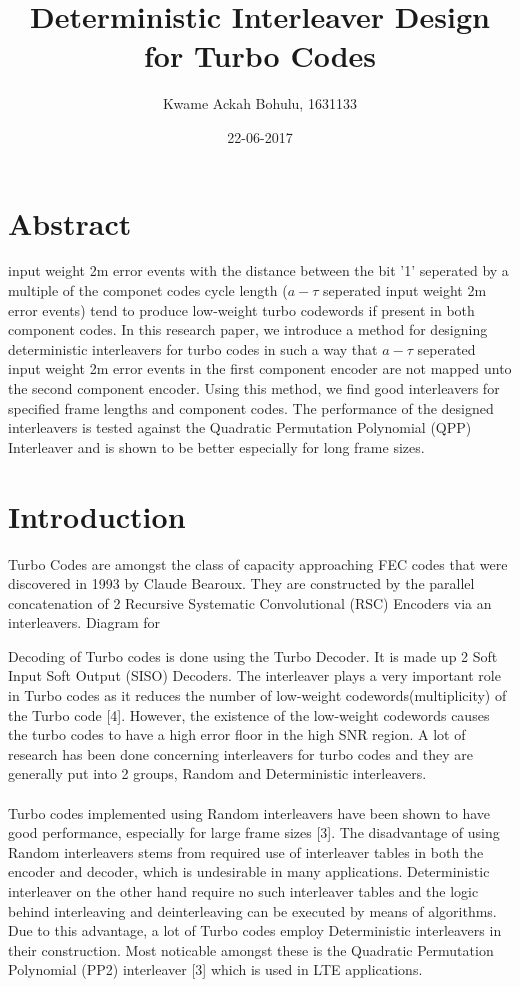 \documentclass[20 pts]{article}
\title{Deterministic Interleaver Design for Turbo Codes}
\author{Kwame Ackah Bohulu, 1631133}
\date{22-06-2017}
\begin{document}
\maketitle
\newpage
\section{Abstract}
input weight 2m error events with the distance between the bit '1' seperated by a 
multiple of
the componet codes cycle length ($a-\tau$ seperated input weight 2m error events) 
tend to produce low-weight turbo codewords if present
in both component codes. In this research paper, we introduce a 
method for designing deterministic
interleavers for turbo codes in such a way that $a-\tau$ seperated input weight 2m error events in 
the first component encoder are not mapped unto the second component encoder. 
Using
this method, we find good interleavers for specified frame lengths and component 
codes. The performance of the designed interleavers is tested against the Quadratic 
Permutation Polynomial (QPP) Interleaver and is shown to be better especially for long
frame sizes.

\section{Introduction}
Turbo Codes are amongst the class of capacity approaching FEC codes that were 
discovered in 1993 by Claude Bearoux. They are constructed by the parallel 
concatenation of 2 Recursive Systematic Convolutional (RSC) Encoders via an interleavers. Diagram for 


Decoding of Turbo codes is done using the Turbo Decoder. It is made up 2 Soft Input Soft 
Output (SISO) Decoders.
The interleaver plays a very important role in Turbo codes as it reduces the number of
 low-weight codewords(multiplicity) of the Turbo code [4]. However, the existence of 
 the low-weight codewords causes the turbo codes to have a high error floor in the 
 high SNR region. A lot of research has been done concerning interleavers for 
 turbo codes and they are generally put into 2 groups, Random and 
 Deterministic interleavers.
\paragraph{}
Turbo codes implemented using Random interleavers have been shown to have good
 performance, especially for large frame sizes [3]. The disadvantage of using 
 Random interleavers stems from required use of interleaver tables in both the 
 encoder and decoder, which is undesirable in many applications. Deterministic interleaver
  on the other hand require no such interleaver tables and the logic behind interleaving
   and deinterleaving can be executed by means of algorithms. Due to this advantage, 
   a lot of Turbo codes employ Deterministic interleavers in their construction. Most 
   noticable amongst these is the Quadratic Permutation Polynomial (PP2) interleaver [3]
    which is used in LTE applications.
\end{document}
